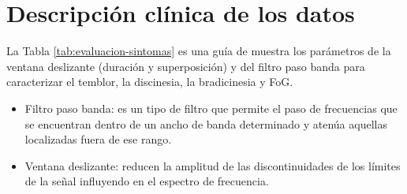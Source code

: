 \section{Descripción clínica de los datos}

La Tabla \ref{tab:evaluacion-sintomas} es una guía de muestra los parámetros de la ventana deslizante (duración y superposición) y del filtro paso banda para caracterizar el temblor, la discinesia, la bradicinesia y FoG.

\begin{itemize}
    \item Filtro paso banda: es un tipo de filtro que permite el paso de frecuencias que se encuentran dentro de un ancho de banda determinado y atenúa aquellas localizadas fuera de ese rango.
    \item Ventana deslizante: reducen la amplitud de las discontinuidades de los límites de la señal influyendo en el espectro de frecuencia.
\end{itemize}